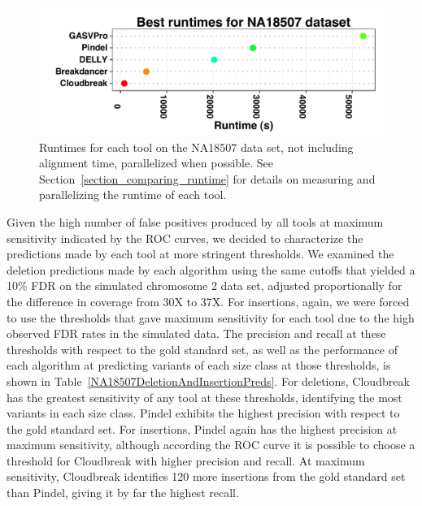 \begin{figure}
\centering
\includegraphics[width=1\textwidth]{figures/NA18507BestRuntimes_horizontal.pdf}
\caption{Runtimes for each tool on the NA18507 data set, not including alignment time, parallelized when possible. See Section~\ref{section_comparing_runtime} for details on measuring and parallelizing the runtime of each tool.}
\label{NA18507BestRuntimes}
\end{figure}

Given the high number of false positives produced by all tools at maximum sensitivity indicated by the ROC curves, we decided to characterize the predictions made by each tool at more stringent thresholds. We examined the deletion predictions made by each algorithm using the same cutoffs that yielded a 10\% FDR on the simulated chromosome 2 data set, adjusted proportionally for the difference in coverage from 30X to 37X. For insertions, again, we were forced to use the thresholds that gave maximum sensitivity for each tool due to the high observed FDR rates in the simulated data. The precision and recall at these thresholds with respect to the gold standard set, as well as the performance of each algorithm at predicting variants of each size class at those thresholds, is shown in Table~\ref{NA18507DeletionAndInsertionPreds}. For deletions, Cloudbreak has the greatest sensitivity of any tool at these thresholds, identifying the most variants in each size class. Pindel exhibits the highest precision with respect to the gold standard set. For insertions, Pindel again has the highest precision at maximum sensitivity, although according the ROC curve it is possible to choose a threshold for Cloudbreak with higher precision and recall. At maximum sensitivity, Cloudbreak identifies 120 more insertions from the gold standard set than Pindel, giving it by far the highest recall.

